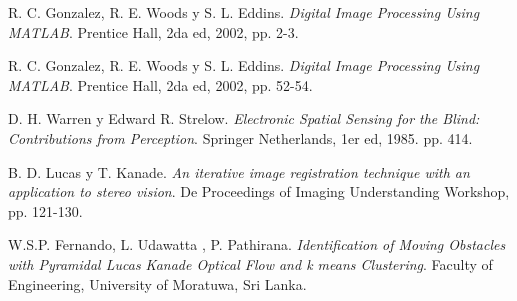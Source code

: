 \begin{thebibliography}{9}

R. C. Gonzalez, R. E. Woods y S. L. Eddins. \textit{Digital Image Processing Using MATLAB}. Prentice Hall, 2da ed, 2002, pp. 2-3.

R. C. Gonzalez, R. E. Woods y S. L. Eddins. \textit{Digital Image Processing Using MATLAB}. Prentice Hall, 2da ed, 2002, pp. 52-54.

D. H. Warren y Edward R. Strelow. \textit{Electronic Spatial Sensing for the Blind: Contributions from Perception}. Springer Netherlands, 1er ed, 1985. pp. 414.

B. D. Lucas y T. Kanade. \textit{An iterative image registration technique with an application to stereo vision}. De Proceedings of Imaging Understanding Workshop, pp. 121-130.

W.S.P. Fernando, L. Udawatta , P. Pathirana. \textit{Identification of Moving Obstacles with Pyramidal
Lucas Kanade Optical Flow and k means
Clustering}. Faculty of Engineering, University of Moratuwa, Sri Lanka.

\end{thebibliography}

